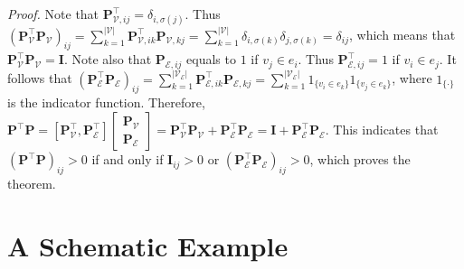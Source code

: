 \documentclass[review]{elsarticle}
\begin{document}
\textit{Proof.} Note that $\mathbf{P}_{\mathcal{V},ij}^\top=\delta_{i,\sigma(j)}$. Thus $(\mathbf{P}_\mathcal{V}^\top\mathbf{P}_\mathcal{V})_{ij}=\sum_{k=1}^{|\mathcal{V}|}\mathbf{P}_{\mathcal{V},ik}^\top\mathbf{P}_{\mathcal{V},kj}=\sum_{k=1}^{|\mathcal{V}|}\delta_{i,\sigma(k)}\delta_{j,\sigma(k)}=\delta_{ij}$, which means that $\mathbf{P}_\mathcal{V}^\top\mathbf{P}_\mathcal{V}=\mathbf{I}$. Note also that $\mathbf{P}_{\mathcal{E},ij}$ equals to $1$ if $v_j\in e_i$. Thus $\mathbf{P}_{\mathcal{E},ij}^\top=1$ if $v_i\in e_j$. It follows that $(\mathbf{P}_\mathcal{E}^\top\mathbf{P}_\mathcal{E})_{ij}=\sum_{k=1}^{|\mathcal{V}_\mathcal{E}|}\mathbf{P}_{\mathcal{E},ik}^\top\mathbf{P}_{\mathcal{E},kj}=\sum_{k=1}^{|\mathcal{V}_\mathcal{E}|}1_{\{v_i\in e_k\}}1_{\{v_j\in e_k\}}$, where $1_{\{\cdot\}}$ is the indicator function. Therefore, $\mathbf{P}^\top\mathbf{P}=\left[\mathbf{P}^\top_\mathcal{V},\mathbf{P}^\top_\mathcal{E}\right]\left[\begin{matrix}\mathbf{P}_\mathcal{V}\\\mathbf{P}_\mathcal{E}\end{matrix}\right]=\mathbf{P}_\mathcal{V}^\top\mathbf{P}_\mathcal{V}+\mathbf{P}_\mathcal{E}^\top\mathbf{P}_\mathcal{E}=\mathbf{I}+\mathbf{P}_\mathcal{E}^\top\mathbf{P}_\mathcal{E}$. This indicates that $(\mathbf{P}^\top\mathbf{P})_{ij}>0$ if and only if $\mathbf{I}_{ij}>0$ or $(\mathbf{P}_\mathcal{E}^\top\mathbf{P}_\mathcal{E})_{ij}>0$, which proves the theorem.

\section{A Schematic Example}
\end{document}
